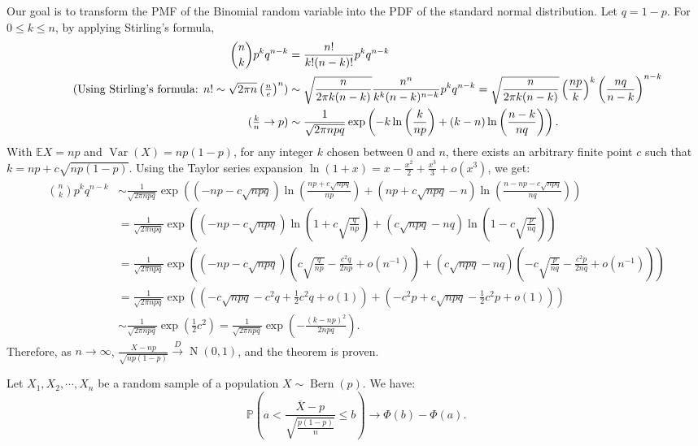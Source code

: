 \documentclass{huhtakm-template-book-v2}
\newcommand{\prob}{\mathbb{P}}
\newcommand{\expect}{\mathbb{E}}
\DeclareMathOperator{\Bern}{Bern}
\DeclareMathOperator{\N}{N}
\DeclareMathOperator{\Var}{Var}
\begin{document}
    \begin{proofing}
        Our goal is to transform the PMF of the Binomial random variable into the PDF of the standard normal distribution. Let $q = 1-p$. For $0 \leq k \leq n$, by applying Stirling's formula,
        \begin{align*}
            \binom{n}{k}p^{k}q^{n-k} &= \frac{n!}{k!(n-k)!}p^{k}q^{n-k}\\
            \tag{Using Stirling's formula: $n! \sim \sqrt{2\pi n}\left(\frac{n}{e}\right)^{n}$}
            &\sim \sqrt{\frac{n}{2\pi k(n-k)}}\frac{n^{n}}{k^{k}(n-k)^{n-k}}p^{k}q^{n-k} = \sqrt{\frac{n}{2\pi k(n-k)}}\left(\frac{np}{k}\right)^{k}\left(\frac{nq}{n-k}\right)^{n-k}\\
            \tag{$\frac{k}{n} \to p$}
            &\sim \frac{1}{\sqrt{2\pi npq}}\exp\left(-k\ln\left(\frac{k}{np}\right)+(k-n)\ln\left(\frac{n-k}{nq}\right)\right).
        \end{align*}
        With $\expect{X} = np$ and $\Var(X) = np(1-p)$, for any integer $k$ chosen between $0$ and $n$, there exists an arbitrary finite point $c$ such that $k = np+c\sqrt{np(1-p)}$. Using the Taylor series expansion $\ln(1+x) = x-\frac{x^{2}}{2}+\frac{x^{3}}{3}+o(x^{3})$, we get:
        \begin{align*}
            \binom{n}{k}p^{k}q^{n-k} &\sim \frac{1}{\sqrt{2\pi npq}}\exp\left((-np-c\sqrt{npq})\ln\left(\frac{np+c\sqrt{npq}}{np}\right)+(np+c\sqrt{npq}-n)\ln\left(\frac{n-np-c\sqrt{npq}}{nq}\right)\right)\\
            &= \frac{1}{\sqrt{2\pi npq}}\exp\left((-np-c\sqrt{npq})\ln\left(1+c\sqrt{\frac{q}{np}}\right)+(c\sqrt{npq}-nq)\ln\left(1-c\sqrt{\frac{p}{nq}}\right)\right)\\
            &= \frac{1}{\sqrt{2\pi npq}}\exp\left((-np-c\sqrt{npq})\left(c\sqrt{\frac{q}{np}}-\frac{c^{2}q}{2np}+o(n^{-1})\right)+(c\sqrt{npq}-nq)\left(-c\sqrt{\frac{p}{nq}}-\frac{c^{2}p}{2nq}+o(n^{-1})\right)\right)\\
            &= \frac{1}{\sqrt{2\pi npq}}\exp\left((-c\sqrt{npq}-c^{2}q+\frac{1}{2}c^{2}q+o(1))+(-c^{2}p+c\sqrt{npq}-\frac{1}{2}c^{2}p+o(1))\right)\\
            &\sim \frac{1}{\sqrt{2\pi npq}}\exp\left(\frac{1}{2}c^{2}\right) = \frac{1}{\sqrt{2\pi npq}}\exp\left(-\frac{(k-np)^{2}}{2npq}\right).
        \end{align*}
        Therefore, as $n \to \infty$, $\frac{X-np}{\sqrt{np(1-p)}} \xrightarrow{D} \N(0,1)$, and the theorem is proven.
    \end{proofing}
    \begin{rem}
        Let $X_{1},X_{2},\cdots,X_{n}$ be a random sample of a population $X \sim \Bern(p)$. We have:
        \begin{equation*}
            \prob\left(a < \frac{\overline{X}-p}{\sqrt{\frac{p(1-p)}{n}}} \leq b\right) \to \Phi(b)-\Phi(a).
        \end{equation*}
    \end{rem}
    \newpage
\end{document}
